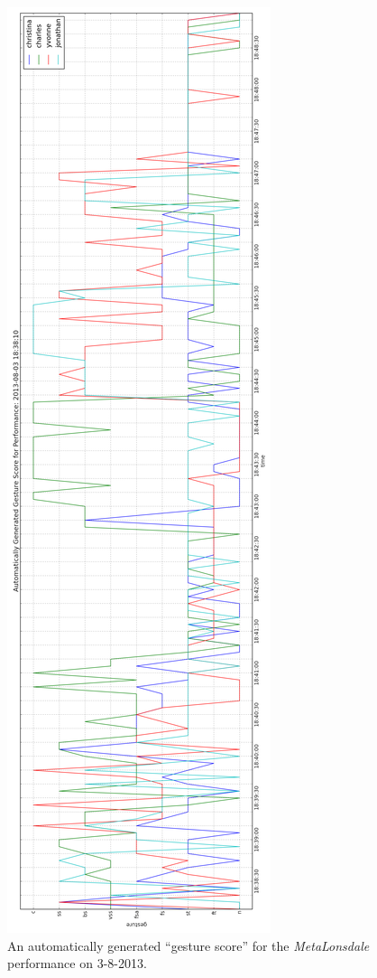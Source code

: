 \documentclass[graybox]{svmult}
\begin{document}
\begin{figure}
\centering
\includegraphics[height=0.9\textheight]{figures/score20130803vert}
\caption{An automatically generated ``gesture score'' for the
  \emph{MetaLonsdale} performance on 3-8-2013. }
\label{gesturescore}
\end{figure}
\end{document}
